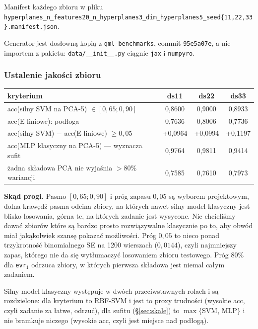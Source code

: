 \documentclass[11pt, a4paper]{article}
\begin{document}
Manifest każdego zbioru w pliku \small\texttt{hyperplanes\allowbreak\_n\allowbreak\_features20\allowbreak\_n\allowbreak\_hyperplanes3\allowbreak\_dim\allowbreak\_hyperplanes5\allowbreak\_seed\allowbreak\{11,22,33\}\allowbreak.manifest.json}\normalsize.

Generator jest dosłowną kopią z \texttt{qml-benchmarks}, commit \texttt{95e5a07e}, a nie importem z pakietu: \texttt{data/\_\_init\_\_.py} ciągnie \texttt{jax} i \texttt{numpyro}.
\subsubsection{Ustalenie jakości zbioru}\label{sec:jakosc-zbioru}

\begin{table}[H]
\centering
\renewcommand{\arraystretch}{1.3}
\begin{tabularx}{\textwidth}{Xccc}
\toprule
\textbf{kryterium} & \textbf{ds11} & \textbf{ds22} & \textbf{ds33} \\
\midrule
acc(silny SVM na PCA-5) $\in [0{,}65; 0{,}90]$ & 0,8600 & 0,9000 & 0,8933 \\
acc(E liniowe): podłoga & 0,7636 & 0,8006 & 0,7736 \\
acc(silny SVM) $-$ acc(E liniowe) $\geq 0{,}05$ & +0,0964 & +0,0994 & +0,1197 \\
acc(MLP klasyczny na PCA-5) --- wyznacza sufit & 0,9764 & 0,9811 & 0,9414 \\
żadna składowa PCA nie wyjaśnia $> 80\%$ wariancji & 0,7585 & 0,7610 & 0,7973 \\
\bottomrule
\end{tabularx}
\end{table}

\textbf{Skąd progi.} Pasmo $[0{,}65; 0{,}90]$ i próg zapasu $0{,}05$ są wyborem projektowym, dolna krawędź pasma odcina zbiory, na których nawet silny model klasyczny jest blisko losowania, górna te, na których zadanie jest wysycone. Nie chcieliśmy dawać zbiorów które są bardzo prosto rozwiązywalne klasycznie po to, aby obwód miał jakąkolwiek szansę pokazać możliwości. Próg $0{,}05$ to nieco ponad trzykrotność binomialnego SE na 1200 wierszach ($0{,}0144$), czyli najmniejszy zapas, którego nie da się wytłumaczyć losowaniem zbioru testowego. Próg $80\%$ dla \texttt{evr}$_1$ odrzuca zbiory, w których pierwsza składowa jest niemal całym zadaniem.

Silny model klasyczny występuje w dwóch przeciwstawnych rolach i są rozdzielone: dla kryterium to RBF-SVM i jest to proxy trudności (wysokie acc, czyli zadanie za łatwe, odrzuć), dla sufitu (\S\ref{sec:skale}) to $\max\{$SVM, MLP$\}$ i nie bramkuje niczego (wysokie acc, czyli jest miejsce nad podłogą).
\end{document}
